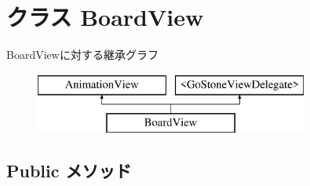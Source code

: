 \hypertarget{interface_board_view}{
\section{クラス BoardView}
\label{interface_board_view}
}
BoardViewに対する継承グラフ\begin{figure}[H]
\begin{center}
\leavevmode
\includegraphics[height=2.000000cm]{interface_board_view}
\end{center}
\end{figure}
\subsection*{Public メソッド}
